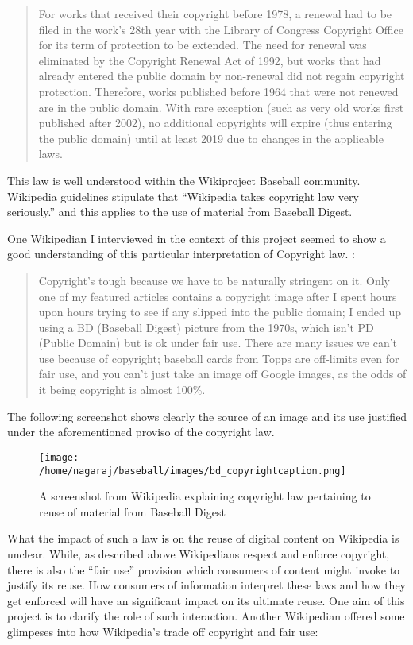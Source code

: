 \documentclass[12pt]{article}
\begin{document}
\begin{quotation}
For works that received their copyright before 1978, a renewal had to be filed in the work's 28th year with the Library of Congress Copyright Office for its term of protection to be extended. The need for renewal was eliminated by the Copyright Renewal Act of 1992, but works that had already entered the public domain by non-renewal did not regain copyright protection. Therefore, works published before 1964 that were not renewed are in the public domain. With rare exception (such as very old works first published after 2002), no additional copyrights will expire (thus entering the public domain) until at least 2019 due to changes in the applicable laws. 
\end{quotation}

This law is well understood within the Wikiproject Baseball community. Wikipedia guidelines stipulate that ``Wikipedia takes copyright law very seriously.''  and this applies to the use of material from Baseball Digest. 

One Wikipedian I interviewed in the context of this project seemed to show a good understanding of this particular interpretation of Copyright law. :

\begin{quotation}
Copyright's tough because we have to be naturally stringent on it. Only one of my featured articles contains a copyright image after I spent hours upon hours trying to see if any slipped into the public domain; I ended up using a BD (Baseball Digest) picture from the 1970s, which isn't PD (Public Domain) but is ok under fair use. There are many issues we can't use because of copyright; baseball cards from Topps are off-limits even for fair use, and you can't just take an image off Google images, as the odds of it being copyright is almost 100\%. 
\end{quotation}

The following screenshot shows clearly the source of an image and its use justified under the aforementioned proviso of the copyright law. 

\begin{figure}[h]
\centering
\texttt{[image: /home/nagaraj/baseball/images/bd\_copyrightcaption.png]}
\caption{A screenshot from Wikipedia explaining copyright law pertaining to reuse of material from Baseball Digest}
\end{figure}

What the impact of such a law is on the reuse of digital content on Wikipedia is unclear. While, as described above Wikipedians respect and enforce copyright, there is also the ``fair use'' provision which consumers of content might invoke to justify its reuse. How consumers of information interpret these laws and how they get enforced will have an significant impact on its ultimate reuse. One aim of this project is to clarify the role of such interaction. Another Wikipedian offered some glimpeses into how Wikipedia's trade off copyright and fair use:
\end{document}

